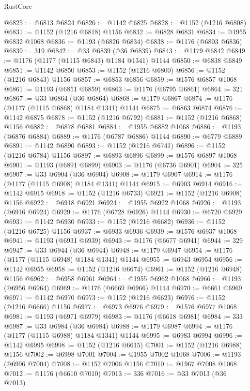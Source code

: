 \begin{lexlean}{RustCore}
\begin{coremodule}
@6825 := @6813 @6824
@6826 := @1142 @6825
@6828 := @1152 (@1216 @6808)
@6831 := @1152 (@1216 @6818) @1156
@6832 := @6828 @6831
@6834 := @1955 @6832 @1068
@6836 := @1193 (@6826 @6834)
@6838 := @1176 (@6803 @6836)
@6839 := 319
@6842 := @33 @6839 (@36 @6839)
@6843 := @1179 @6842
@6849 := @1176 (@1177 (@1115 @6843) @1184 @1341) @1144
@6850 := @6838 @6849
@6851 := @1142 @6850
@6853 := @1152 (@1216 @6800)
@6856 := @1152 (@1216 @6843) @1156
@6857 := @6853 @6856
@6859 := @1576 @6857 @1068
@6861 := @1193 (@6851 @6859)
@6863 := @1176 (@6795 @6861)
@6864 := 321
@6867 := @33 @6864 (@36 @6864)
@6868 := @1179 @6867
@6874 := @1176 (@1177 (@1115 @6868) @1184 @1341) @1144
@6875 := @6863 @6874
@6876 := @1142 @6875
@6878 := @1152 (@1216 @6792)
@6881 := @1152 (@1216 @6868) @1156
@6882 := @6878 @6881
@6884 := @1955 @6882 @1068
@6886 := @1193 (@6876 @6884)
@6889 := @1176 (@6787 @6886) @1144
@6890 := @6779 @6889
@6891 := @1142 @6890
@6893 := @1152 (@1216 @6741)
@6896 := @1152 (@1216 @6784) @1156
@6897 := @6893 @6896
@6899 := @1576 @6897 @1068
@6901 := @1193 (@6891 @6899)
@6903 := @1176 (@6736 @6901)
@6904 := 325
@6907 := @33 @6904 (@36 @6904)
@6908 := @1179 @6907
@6914 := @1176 (@1177 (@1115 @6908) @1184 @1341) @1144
@6915 := @6903 @6914
@6916 := @1142 @6915
@6918 := @1152 (@1216 @6733)
@6921 := @1152 (@1216 @6908) @1156
@6922 := @6918 @6921
@6924 := @1955 @6922 @1068
@6926 := @1193 (@6916 @6924)
@6929 := @1176 (@6728 @6926) @1144
@6930 := @6720 @6929
@6931 := @1142 @6930
@6933 := @1152 (@1216 @6682)
@6936 := @1152 (@1216 @6725) @1156
@6937 := @6933 @6936
@6939 := @1576 @6937 @1068
@6941 := @1193 (@6931 @6939)
@6943 := @1176 (@6677 @6941)
@6944 := 329
@6947 := @33 @6944 (@36 @6944)
@6948 := @1179 @6947
@6954 := @1176 (@1177 (@1115 @6948) @1184 @1341) @1144
@6955 := @6943 @6954
@6956 := @1142 @6955
@6958 := @1152 (@1216 @6674)
@6961 := @1152 (@1216 @6948) @1156
@6962 := @6958 @6961
@6964 := @1955 @6962 @1068
@6966 := @1193 (@6956 @6964)
@6969 := @1176 (@6669 @6966) @1144
@6970 := @6661 @6969
@6971 := @1142 @6970
@6973 := @1152 (@1216 @6623)
@6976 := @1152 (@1216 @6666) @1156
@6977 := @6973 @6976
@6979 := @1576 @6977 @1068
@6981 := @1193 (@6971 @6979)
@6983 := @1176 (@6618 @6981)
@6984 := 333
@6987 := @33 @6984 (@36 @6984)
@6988 := @1179 @6987
@6994 := @1176 (@1177 (@1115 @6988) @1184 @1341) @1144
@6995 := @6983 @6994
@6996 := @1142 @6995
@6998 := @1152 (@1216 @6615)
@7001 := @1152 (@1216 @6988) @1156
@7002 := @6998 @7001
@7004 := @1955 @7002 @1068
@7006 := @1193 (@6996 @7004)
@7008 := @1152 @7006 @1156
@7010 := @1967 @7008 @1068
@7012 := @1176 (@6610 @7010)
@7013 := 336
@7016 := @33 @7013 (@36 @7013)

\end{coremodule}
\end{lexlean}

